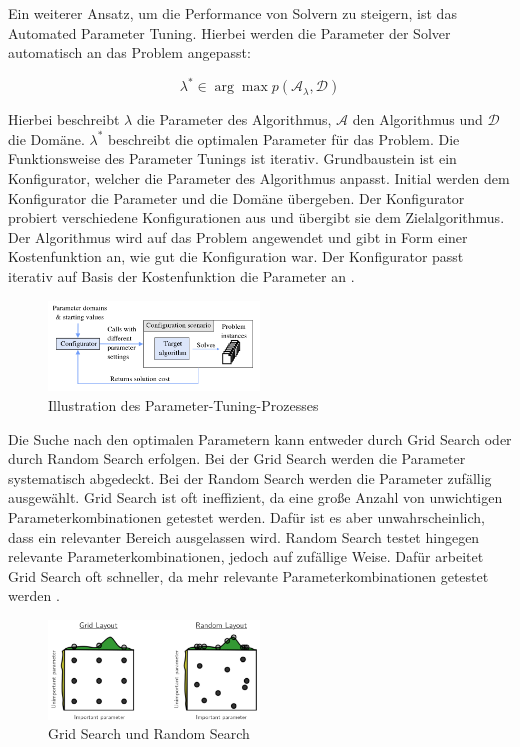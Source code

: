 Ein weiterer Ansatz, um die Performance von Solvern zu steigern, ist das
Automated Parameter Tuning. Hierbei werden die Parameter der Solver automatisch
an das Problem angepasst:

\[
\lambda^{*} \in \arg\max p(\mathcal{A}_{\lambda}, \mathcal{D})
\]

Hierbei beschreibt \(\lambda\) die Parameter des Algorithmus, \(\mathcal{A}\)
den Algorithmus und \(\mathcal{D}\) die Domäne. \(\lambda^{*}\) beschreibt die
optimalen Parameter für das Problem. Die Funktionsweise des Parameter Tunings
ist iterativ. Grundbaustein ist ein Konfigurator, welcher die Parameter des
Algorithmus anpasst. Initial werden dem Konfigurator die Parameter und die
Domäne übergeben. Der Konfigurator probiert verschiedene Konfigurationen aus und
übergibt sie dem Zielalgorithmus. Der Algorithmus wird auf das Problem
angewendet und gibt in Form einer Kostenfunktion an, wie gut die Konfiguration
war. Der Konfigurator passt iterativ auf Basis der Kostenfunktion die Parameter
an \cite[31-38]{kotth23pr}.

\begin{figure}[h]
    \centering
    \includegraphics[width=0.5\textwidth]{figures/Automated Parameter Tuning [kotth23pr].PNG}
    \caption{Illustration des Parameter-Tuning-Prozesses \cite[34]{kotth23pr}}
    \label{fig:bild}
\end{figure}

Die Suche nach den optimalen Parametern kann entweder durch Grid Search oder
durch Random Search erfolgen. Bei der Grid Search werden die Parameter
systematisch abgedeckt. Bei der Random Search werden die Parameter zufällig
ausgewählt. Grid Search ist oft ineffizient, da eine große Anzahl von
unwichtigen Parameterkombinationen getestet werden. Dafür ist es aber
unwahrscheinlich, dass ein relevanter Bereich ausgelassen wird. Random Search
testet hingegen relevante Parameterkombinationen, jedoch auf zufällige Weise.
Dafür arbeitet Grid Search oft schneller, da mehr relevante
Parameterkombinationen getestet werden \cite[39]{kotth23pr}.

\begin{figure}[h]
    \centering
    \includegraphics[width=0.5\textwidth]{figures/Grid Search vs. Random Search [kotth23pr].PNG}
    \caption{Grid Search und Random Search \cite[39]{kotth23pr}}
    \label{fig:bild}
\end{figure}

